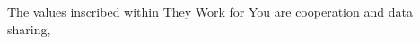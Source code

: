 \color{blue}
The values inscribed within They Work for You are cooperation and data sharing,
\color{darkgray}
